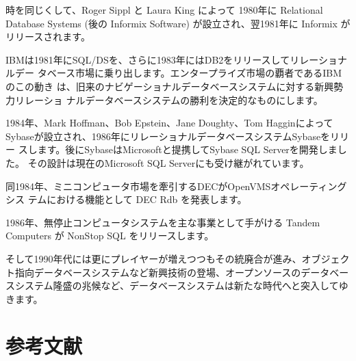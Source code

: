 時を同じくして、Roger Sippl と Laura King によって 1980年に Relational
Database Systems (後の Informix Software) が設立され、翌1981年に
Informix がリリースされます。


IBMは1981年にSQL/DSを、さらに1983年にはDB2をリリースしてリレーショナルデー
タベース市場に乗り出します。エンタープライズ市場の覇者であるIBMのこの動き
は、旧来のナビゲーショナルデータベースシステムに対する新興勢力リレーショ
ナルデータベースシステムの勝利を決定的なものにします。


1984年、Mark Hoffman、Bob Epstein、Jane Doughty、Tom Hagginによって
Sybaseが設立され、1986年にリレーショナルデータベースシステムSybaseをリリー
スします。後にSybaseはMicrosoftと提携してSybase SQL Serverを開発しました。
その設計は現在のMicrosoft SQL Serverにも受け継がれています。


同1984年、ミニコンピュータ市場を牽引するDECがOpenVMSオペレーティングシス
テムにおける機能として DEC Rdb を発表します。


1986年、無停止コンピュータシステムを主な事業として手がける Tandem
Computers が NonStop SQL をリリースします。


そして1990年代には更にプレイヤーが増えつつもその統廃合が進み、オブジェク
ト指向データベースシステムなど新興技術の登場、オープンソースのデータベー
スシステム隆盛の兆候など、データベースシステムは新たな時代へと突入してゆ
きます。


\section*{参考文献}


\small


